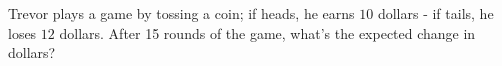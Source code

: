 Trevor plays a game by tossing a coin; if heads, he earns $10$ dollars - if tails, he loses $12$ dollars. After 15 rounds of the game, what's the expected change in dollars?
